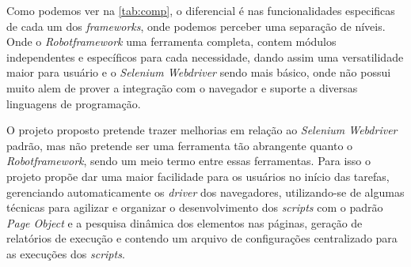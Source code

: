         Como podemos ver na \autoref{tab:comp}, o diferencial é nas funcionalidades especificas de cada um dos \textit{frameworks}, onde podemos perceber
        uma separação de níveis. Onde o \textit{Robotframework} uma ferramenta completa, contem módulos independentes e específicos para cada necessidade,
        dando assim uma versatilidade maior para usuário e o \textit{Selenium Webdriver} sendo mais básico, onde não possui muito alem de prover a
        integração com o navegador e suporte a diversas linguagens de programação.

        O projeto proposto pretende trazer melhorias em relação ao \textit{Selenium Webdriver} padrão, mas não pretende ser uma ferramenta tão abrangente
        quanto o \textit{Robotframework}, sendo um meio termo entre essas ferramentas. Para isso o projeto propõe dar uma maior facilidade para os usuários
        no início das tarefas, gerenciando automaticamente os \textit{driver} dos navegadores, utilizando-se de algumas técnicas para agilizar e organizar
        o desenvolvimento dos \textit{scripts} com o padrão \textit{Page Object} e a pesquisa dinâmica dos elementos nas páginas, geração de relatórios de
        execução e contendo um arquivo de configurações centralizado para as execuções dos \textit{scripts}.
